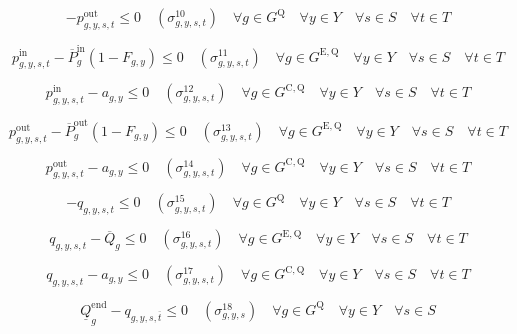 \documentclass{article}
\newcommand{\sStorage}{G^{\mathrm{Q}}}
\newcommand{\sStorageExisting}{G^{\mathrm{E,Q}}}
\newcommand{\sStorageCandidate}{G^{\mathrm{C,Q}}}
\newcommand{\sYears}{Y}
\newcommand{\sScenarios}{S}
\newcommand{\sIntervals}{T}
\newcommand{\iGenerator}{g}
\newcommand{\iYear}{y}
\newcommand{\iScenario}{s}
\newcommand{\iInterval}{t}
\newcommand{\iIntervalTerminal}{\overline{\iInterval}}
\newcommand{\cPowerChargingMax}[1][\iGenerator]{\overline{P}^{\mathrm{in}}_{#1}}
\newcommand{\cPowerDischargingMax}[1][\iGenerator]{\overline{P}^{\mathrm{out}}_{#1}}
\newcommand{\cStorageUnitEnergyMax}[1][\iGenerator]{\overline{Q}_{#1}}
\newcommand{\cStorageUnitEnergyIntervalEndMin}[1][\iGenerator]{\underline{Q}^{\mathrm{end}}_{#1}}
\newcommand{\cRetirementIndicator}[1][\iGenerator,\iYear]{F_{#1}}
\newcommand{\vPowerIn}[1][\iGenerator,\iYear,\iScenario,\iInterval]{p^{\mathrm{in}}_{#1}}
\newcommand{\vPowerOut}[1][\iGenerator,\iYear,\iScenario,\iInterval]{p^{\mathrm{out}}_{#1}}
\newcommand{\vStorageUnitEnergy}[1][\iGenerator,\iYear,\iScenario,\iInterval]{q_{#1}}
\newcommand{\vInstalledCapacityTotal}[1][\iGenerator,\iYear]{a_{#1}}
\newcommand{\dNonNegativeDischarging}[1][\iGenerator,\iYear,\iScenario,\iInterval]{\sigma_{#1}^{10}}
\newcommand{\dMaxChargingRateExisting}[1][\iGenerator,\iYear,\iScenario,\iInterval]{\sigma_{#1}^{11}}
\newcommand{\dMaxChargingRateCandidate}[1][\iGenerator,\iYear,\iScenario,\iInterval]{\sigma_{#1}^{12}}
\newcommand{\dMaxDischargingRateExisting}[1][\iGenerator,\iYear,\iScenario,\iInterval]{\sigma_{#1}^{13}}
\newcommand{\dMaxDischargingRateCandidate}[1][\iGenerator,\iYear,\iScenario,\iInterval]{\sigma_{#1}^{14}}
\newcommand{\dNonNegativeStorageEnergy}[1][\iGenerator,\iYear,\iScenario,\iInterval]{\sigma_{#1}^{15}}
\newcommand{\dMaxStorageEnergyExisting}[1][\iGenerator,\iYear,\iScenario,\iInterval]{\sigma_{#1}^{16}}
\newcommand{\dMaxStorageEnergyCandidate}[1][\iGenerator,\iYear,\iScenario,\iInterval]{\sigma_{#1}^{17}}
\newcommand{\dMinStorageEnergyIntervalEnd}[1][\iGenerator,\iYear,\iScenario]{\sigma_{#1}^{18}}
\newcommand{\sScenarioSets}{\quad \forall \iYear \in \sYears \quad \forall \iScenario \in \sScenarios \quad \forall \iInterval \in \sIntervals}
\begin{document}
\begin{equation}
	-\vPowerOut \leq 0 \quad (\dNonNegativeDischarging) \quad \forall \iGenerator \in \sStorage \sScenarioSets
\end{equation}

\begin{equation}
	\vPowerIn - \cPowerChargingMax \left(1 - \cRetirementIndicator\right) \leq 0 \quad (\dMaxChargingRateExisting) \quad \forall \iGenerator \in \sStorageExisting \sScenarioSets
\end{equation}

\begin{equation}
	\vPowerIn - \vInstalledCapacityTotal \leq 0 \quad (\dMaxChargingRateCandidate) \quad \forall \iGenerator \in \sStorageCandidate \sScenarioSets
\end{equation}

\begin{equation}
	\vPowerOut - \cPowerDischargingMax \left(1 - \cRetirementIndicator\right) \leq 0 \quad (\dMaxDischargingRateExisting) \quad \forall \iGenerator \in \sStorageExisting \sScenarioSets
\end{equation}

\begin{equation}
	\vPowerOut - \vInstalledCapacityTotal \leq 0 \quad (\dMaxDischargingRateCandidate) \quad \forall \iGenerator \in \sStorageCandidate \sScenarioSets
\end{equation}

\begin{equation}
	- \vStorageUnitEnergy \leq 0 \quad (\dNonNegativeStorageEnergy) \quad \forall \iGenerator \in \sStorage \sScenarioSets
\end{equation}

\begin{equation}
	\vStorageUnitEnergy - \cStorageUnitEnergyMax \leq 0 \quad (\dMaxStorageEnergyExisting) \quad \forall \iGenerator \in \sStorageExisting \sScenarioSets
\end{equation}

\begin{equation}
	\vStorageUnitEnergy - \vInstalledCapacityTotal \leq 0 \quad (\dMaxStorageEnergyCandidate) \quad \forall \iGenerator \in \sStorageCandidate \sScenarioSets
\end{equation}

\begin{equation}
	\cStorageUnitEnergyIntervalEndMin - \vStorageUnitEnergy[\iGenerator,\iYear,\iScenario,\iIntervalTerminal]\leq  0 \quad (\dMinStorageEnergyIntervalEnd) \quad \forall \iGenerator \in \sStorage \quad \forall \iYear \in \sYears \quad \forall \iScenario \in \sScenarios
\end{equation}
\end{document}
